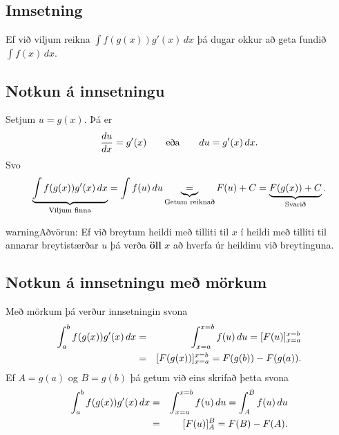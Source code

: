 \documentclass[b5paper,10pt,icelandic]{sphinxmanual}
\begin{document}
\subsection{Innsetning}
\label{kafli06:index-9}\label{kafli06:innsetning}
Ef við viljum reikna \(\int f(g(x))g'(x)\, dx\) þá dugar okkur að
geta fundið \(\int f(x)\, dx\).


\subsection{Notkun á innsetningu}
\label{kafli06:notkun-a-innsetningu}
Setjum \(u=g(x)\). Þá er
\begin{gather}
\begin{split}\frac{du}{dx}=g'(x)\qquad \text{eða} \qquad du=g'(x)\,dx.\end{split}\notag
\end{gather}
Svo
\begin{gather}
\begin{split}\underbrace{\int f(g(x))g'(x)\,dx}_{\text{Viljum finna}}  =
\int f(u)\,du
\underbrace{=}_{\text{Getum reiknað}} F(u)+C  =
\underbrace{F(g(x))+C}_{\text{Svarið}}.\end{split}\notag
\end{gather}
\begin{notice}{warning}{Aðvörun:}
Ef við breytum heildi með tilliti til \(x\) í heildi með tilliti til
annarar breytistærðar \(u\) þá verða \textbf{öll} \(x\) að hverfa úr
heildinu við breytinguna.
\end{notice}


\subsection{Notkun á innsetningu með mörkum}
\label{kafli06:notkun-a-innsetningu-me-morkum}
Með mörkum þá verður innsetningin svona
\begin{gather}
\begin{split}\begin{aligned}
  \int_a^b f(g(x))g'(x)\, dx  &=&
  \int_{x=a}^{x=b} f(u)\, du  =
  [F(u)]_{x=a}^{x=b}    \\ &=&
  [F(g(x))]_{x=a}^{x=b}     =
  F(g(b)) - F(g(a)).\end{aligned}\end{split}\notag
\end{gather}
Ef \(A=g(a)\) og \(B=g(b)\) þá getum við eins skrifað þetta
svona
\begin{gather}
\begin{split}\begin{aligned}
\int_a^b f(g(x))g'(x)\, dx  &=&
\int_{x=a}^{x=b} f(u)\, du  =
\int_{A}^{B} f(u)\, du    \\ &=&
[F(u)]_A^B      =
F(B) - F(A).\end{aligned}\end{split}\notag
\end{gather}
\end{document}
